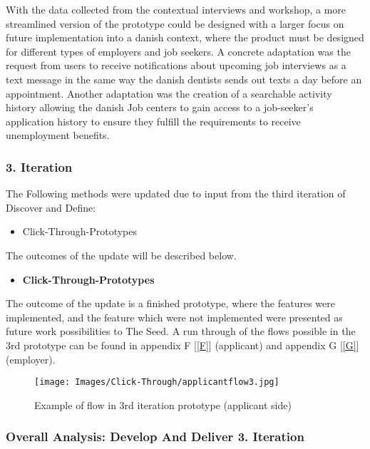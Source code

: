 With the data collected from the contextual interviews and workshop, a more streamlined version of the prototype could be designed with a larger focus on future implementation into a danish context, where the product must be designed for different types of employers and job seekers. A concrete adaptation was the request from users to receive notifications about upcoming job interviews as a text message in the same way the danish dentists sends out texts a day before an appointment. Another adaptation was the creation of a searchable activity history allowing the danish Job centers to gain access to a job-seeker’s application history to ensure they fulfill the requirements to receive unemployment benefits.


\subsubsection{3. Iteration}

The Following methods were updated due to input from the third iteration of Discover and Define:
\begin{itemize}
    \item Click-Through-Prototypes
\end{itemize}

The outcomes of the update will be described below.

\begin{itemize}
    \item \bf{Click-Through-Prototypes}
\end{itemize}

The outcome of the update is a finished prototype, where the features were implemented, and the feature which were not implemented were presented as future work possibilities to The Seed. A run through of the flows possible in the 3rd prototype can be found in appendix F [\ref{F}] (applicant) and appendix G [\ref{G}] (employer).
\begin{figure}[H]
\centering
\caption{Example of flow in 3rd iteration prototype (applicant side)}
\label{click-through1}
{\texttt{[image: Images/Click-Through/applicantflow3.jpg]}}
\end{figure}

\subsubsection{Overall Analysis: Develop And Deliver 3. Iteration}


